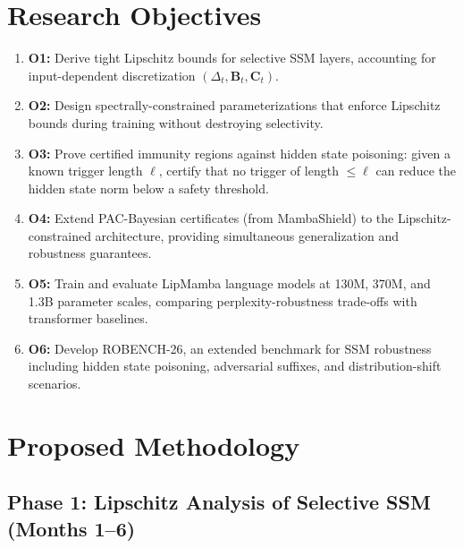 \documentclass[12pt,a4paper]{article}
\begin{document}
\section{Research Objectives}

\begin{enumerate}
    \item \textbf{O1:} Derive tight Lipschitz bounds for selective SSM layers, accounting for input-dependent discretization $(\Delta_t, \mathbf{B}_t, \mathbf{C}_t)$.
    
    \item \textbf{O2:} Design spectrally-constrained parameterizations that enforce Lipschitz bounds during training without destroying selectivity.
    
    \item \textbf{O3:} Prove certified immunity regions against hidden state poisoning: given a known trigger length $\ell$, certify that no trigger of length $\leq \ell$ can reduce the hidden state norm below a safety threshold.
    
    \item \textbf{O4:} Extend PAC-Bayesian certificates (from MambaShield) to the Lipschitz-constrained architecture, providing simultaneous generalization and robustness guarantees.
    
    \item \textbf{O5:} Train and evaluate LipMamba language models at 130M, 370M, and 1.3B parameter scales, comparing perplexity-robustness trade-offs with transformer baselines.
    
    \item \textbf{O6:} Develop ROBENCH-26, an extended benchmark for SSM robustness including hidden state poisoning, adversarial suffixes, and distribution-shift scenarios.
\end{enumerate}

\section{Proposed Methodology}

\subsection{Phase 1: Lipschitz Analysis of Selective SSM (Months 1--6)}
\end{document}
